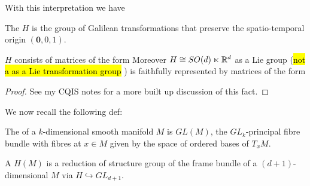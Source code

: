 \documentclass{article}
\begin{document}
With this interpretation we have

\begin{definition}
	The  $H$ is the group of Galilean transformations that preserve the spatio-temporal origin $(\bm{0},0,1)$. 
\end{definition}

\begin{prop}
	$H$ consists of matrices of the form 
Moreover $H \cong SO(d)\ltimes \mathbb{R}^d$ as a Lie group (\hl{not a as a Lie transformation group} \cite{Kunzle1972} ) is faithfully represented by matrices of the form 
\end{prop}
\begin{proof}
	See my CQIS notes for a more built up discussion of this fact. 
\end{proof}

We now recall the following def:

\begin{definition}
	The  of a $k$-dimensional smooth manifold $M$ is $GL(M)$, the $GL_k$-principal fibre bundle with fibres at $x \in M$ given by the space of ordered bases of $T_xM$. 
\end{definition}

\begin{definition}
	A  $H(M)$ is a reduction of structure group of the frame bundle of a $(d+1)$-dimensional $M$ via $H \hookrightarrow GL_{d+1} $.
\end{definition}





\end{document}
